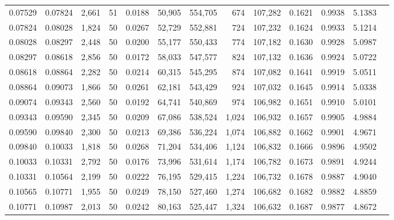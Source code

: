 \begin{tabular}{rrrrrrrrrrrrr}
0.07529 & 0.07824 & 2,661 &  51 &                                     0.0188 &  50,905 & 554,705 &     674 & 107,282 & 0.1621 & 0.9938 & 5.1383 \\
0.07824 & 0.08028 & 1,824 &  50 &                                     0.0267 &  52,729 & 552,881 &     724 & 107,232 & 0.1624 & 0.9933 & 5.1214 \\
0.08028 & 0.08297 & 2,448 &  50 &                                     0.0200 &  55,177 & 550,433 &     774 & 107,182 & 0.1630 & 0.9928 & 5.0987 \\
0.08297 & 0.08618 & 2,856 &  50 &                                     0.0172 &  58,033 & 547,577 &     824 & 107,132 & 0.1636 & 0.9924 & 5.0722 \\
0.08618 & 0.08864 & 2,282 &  50 &                                     0.0214 &  60,315 & 545,295 &     874 & 107,082 & 0.1641 & 0.9919 & 5.0511 \\
0.08864 & 0.09073 & 1,866 &  50 &                                     0.0261 &  62,181 & 543,429 &     924 & 107,032 & 0.1645 & 0.9914 & 5.0338 \\
0.09074 & 0.09343 & 2,560 &  50 &                                     0.0192 &  64,741 & 540,869 &     974 & 106,982 & 0.1651 & 0.9910 & 5.0101 \\
0.09343 & 0.09590 & 2,345 &  50 &                                     0.0209 &  67,086 & 538,524 &   1,024 & 106,932 & 0.1657 & 0.9905 & 4.9884 \\
0.09590 & 0.09840 & 2,300 &  50 &                                     0.0213 &  69,386 & 536,224 &   1,074 & 106,882 & 0.1662 & 0.9901 & 4.9671 \\
0.09840 & 0.10033 & 1,818 &  50 &                                     0.0268 &  71,204 & 534,406 &   1,124 & 106,832 & 0.1666 & 0.9896 & 4.9502 \\
0.10033 & 0.10331 & 2,792 &  50 &                                     0.0176 &  73,996 & 531,614 &   1,174 & 106,782 & 0.1673 & 0.9891 & 4.9244 \\
0.10331 & 0.10564 & 2,199 &  50 &                                     0.0222 &  76,195 & 529,415 &   1,224 & 106,732 & 0.1678 & 0.9887 & 4.9040 \\
0.10565 & 0.10771 & 1,955 &  50 &                                     0.0249 &  78,150 & 527,460 &   1,274 & 106,682 & 0.1682 & 0.9882 & 4.8859 \\
0.10771 & 0.10987 & 2,013 &  50 &                                     0.0242 &  80,163 & 525,447 &   1,324 & 106,632 & 0.1687 & 0.9877 & 4.8672 \\

\end{tabular}

